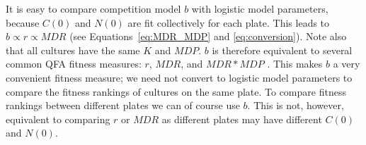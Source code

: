 
It is easy to compare competition model \(b\) with logistic model
parameters, because \(C(0)\) and \(N(0)\) are fit collectively for
each plate. This leads to \(b \propto r \propto MDR\) (see
Equations~\ref{eq:MDR_MDP} and \ref{eq:conversion}). Note also that
all cultures have the same \(K\) and \(MDP\). \(b\) is therefore
equivalent to several common QFA fitness measures: \(r\), \(MDR\), and
\(MDR*MDP\) \citep{Addinall2011}. This makes \(b\) a very convenient
fitness measure; we need not convert to logistic model parameters to
compare the fitness rankings of cultures on the same plate. To compare
fitness rankings between different plates we can of course use
\(b\). This is not, however, equivalent to comparing \(r\) or \(MDR\)
as different plates may have different \(C(0)\) and \(N(0)\).


